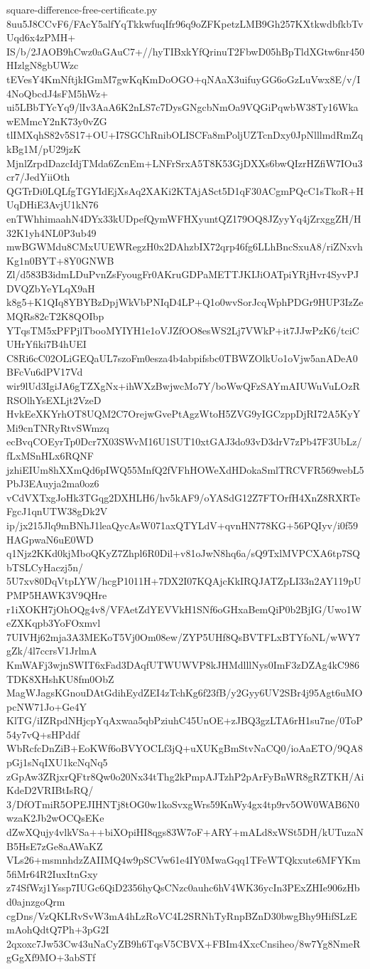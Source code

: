 \documentclass[11pt]{article}
\theoremstyle{definition}
\theoremstyle{remark}
\begin{document}
\begin{filecontents*}[overwrite]{square-difference-free-certificate.py}
8uu5J8CCvF6/FAcY5alfYqTkkwfuqIfr96q9oZFKpetzLMB9Gh257KXtkwdbfkbTvUqd6x4zPMH+
IS/b/2JAOB9hCwz0aGAuC7+//hyTIBxkYfQrinuT2FbwD05hBpTldXGtw6nr450HIzlgN8gbUWzc
tEVesY4KmNftjkIGmM7gwKqKmDoOGO+qNAaX3uifuyGG6oGzLuVwx8E/v/I4NoQbcdJ4sFM5hWz+
ui5LBbTYcYq9/lIv3AaA6K2nLS7c7DysGNgcbNmOa9VQGiPqwbW38Ty16WkawEMmcY2nK73y0vZG
tlIMXqhS82v5S17+OU+I7SGChRnibOLISCFa8mPoljUZTcnDxy0JpNlllmdRmZqkBg1M/pU29jzK
MjnlZrpdDazcIdjTMda6ZcnEm+LNFrSrxA5T8K53GjDXXs6bwQIzrHZfiW7IOu3cr7/JedYiiOth
QGTrDi0LQLfgTGYIdEjXsAq2XAKi2KTAjASct5D1qF30ACgmPQcC1sTkoR+HUqDHiE3AvjU1kN76
enTWhhimaahN4DYx33kUDpefQymWFHXyuntQZ179OQ8JZyyYq4jZrxggZH/H32K1yh4NL0P3ub49
mwBGWMdu8CMxUUEWRegzH0x2DAhzbIX72qrp46fg6LLhBncSxuA8/riZNxvhKg1n0BYT+8Y0GNWB
Zl/d583B3idmLDuPvnZsFyougFr0AKruGDPaMETTJKIJiOATpiYRjHvr4SyvPJDVQZbYeYLqX9aH
k8g5+K1QIq8YBYBzDpjWkVbPNIqD4LP+Q1o0wvSorJcqWphPDGr9HUP3IzZeMQRs82cT2K8QOIbp
YTqsTM5xPFPjlTbooMYIYH1e1oVJZfOO8esWS2Lj7VWkP+it7JJwPzK6/tciCUHrYfiki7B4hUEI
C8Ri6cC02OLiGEQaUL7szoFm0esza4b4abpifsbc0TBWZOlkUo1oVjw5anADeA0BFcVu6dPV17Vd
wir9lUd3IgiJA6gTZXgNx+ihWXzBwjwcMo7Y/boWwQFzSAYmAIUWuVuLOzRRSOlhYsEXLjt2VzeD
HvkEeXKYrhOT8UQM2C7OrejwGvePtAgzWtoH5ZVG9yIGCzppDjRI72A5KyYMi9cnTNRyRtvSWmzq
ecBvqCOEyrTp0Dcr7X03SWvM16U1SUT10xtGAJ3do93vD3drV7zPb47F3UbLz/fLxMSnHLx6RQNF
jzhiEIUm8hXXmQd6pIWQ55MnfQ2fVFhHOWeXdHDokaSmlTRCVFR569webL5PbJ3EAuyja2ma0oz6
vCdVXTxgJoHk3TGqg2DXHLH6/hv5kAF9/oYASdG12Z7FTOrfH4XnZ8RXRTeFgcJ1qnUTW38gDk2V
ip/jx215Jlq9mBNhJ1leaQycAsW071axQTYLdV+qvnHN778KG+56PQIyv/i0f59HAGpwaN6uE0WD
q1Njz2KKd0kjMboQKyZ7Zhpl6R0Dil+v81oJwN8hq6a/sQ9TxlMVPCXA6tp7SQbTSLCyHaczj5n/
5U7xv80DqVtpLYW/hcgP1011H+7DX2I07KQAjcKkIRQJATZpLI33n2AY119pUPMP5HAWK3V9QHre
r1iXOKH7jOhOQg4v8/VFAetZdYEVVkH1SNf6oGHxaBemQiP0b2BjIG/Uwo1WeZXKqpb3YoFOxmvl
7UIVHj62mja3A3MEKoT5Vj0Om08ew/ZYP5UHf8QsBVTFLxBTYfoNL/wWY7gZk/4l7ccrsV1JrlmA
KmWAFj3wjnSWIT6xFad3DAqfUTWUWVP8kJHMdlllNys0ImF3zDZAg4kC986TDK8XHshKU8fm0ObZ
MagWJagsKGnouDAtGdihEydZEI4zTchKg6f23fB/y2Gyy6UV2SBr4j95Agt6uMOpcNW71Jo+Ge4Y
KlTG/iIZRpdNHjcpYqAxwaa5qbPziuhC45UnOE+zJBQ3gzLTA6rH1su7ne/0ToP54y7vQ+sHPddf
WbRcfcDnZiB+EoKWf6oBVYOCLf3jQ+uXUKgBmStvNaCQ0/ioAaETO/9QA8pGj1sNqIXU1kcNqNq5
zGpAw3ZRjxrQFtr8Qw0o20Nx34tThg2kPmpAJTzhP2pArFyBnWR8gRZTKH/AiKdeD2VRIBtIsRQ/
3/DfOTmiR5OPEJIHNTj8tOG0w1koSvxgWrs59KnWy4gx4tp9rv5OW0WAB6N0wzaK2Jb2wOCQsEKe
dZwXQujy4vlkVSa++biXOpiHI8qgs83W7oF+ARY+mALd8xWSt5DH/kUTuzaNB5HsE7zGe8aAWaKZ
VLs26+msmnhdzZAIIMQ4w9pSCVw61e4IY0MwaGqq1TFeWTQkxute6MFYKm5fiMr64R2IuxItnGxy
z74SfWzj1Yssp7IUGc6QiD2356hyQsCNzc0auhc6hV4WK36ycIn3PExZHIe906zHbd0ajnzgoQrm
cgDns/VzQKLRvSvW3mA4hLzRoVC4L2SRNhTyRnpBZnD30bwgBhy9HifSLzEmAohQdtQ7Ph+3pG2I
2qxoxc7Jw53Cw43uNaCyZB9h6TqsV5CBVX+FBIm4XxcCnsiheo/8w7Yg8NmeRgGgXf9MO+3abSTf

\end{filecontents*}
\end{document}
